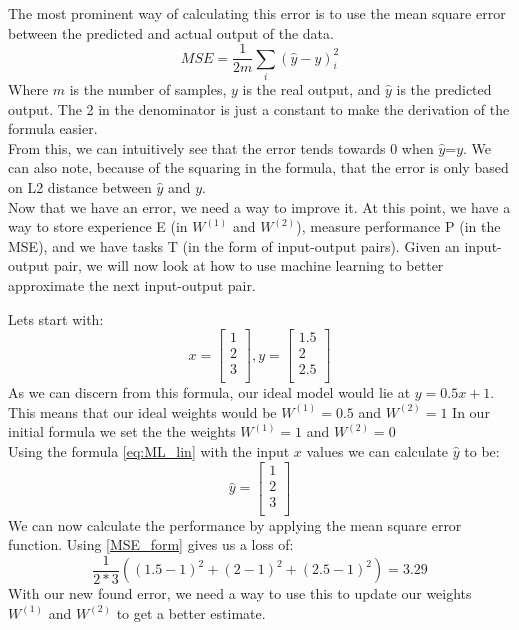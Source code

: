 The most prominent way of calculating this error is to use the mean square error between the predicted and actual output of the data. 
\begin{equation}\label{MSE_form}
     MSE=\frac{1}{2m} \sum_i (\hat{y}-y)_i^2
\end{equation}
Where $m$ is the number of samples, $y$ is the real output, and $\hat{y}$ is the predicted output. The 2 in the denominator is just a constant to make the derivation of the formula easier.\\
From this, we can intuitively see that the error tends towards 0 when $\hat{y}$=$y$. We can also note, because of the squaring in the formula, that the error is only based on L2 distance between $\hat{y}$ and $y$.\\
Now that we have an error, we need a way to improve it.
At this point, we have a way to store experience E (in  $W^{(1)}$ and $W^{(2)}$), measure performance P (in the MSE), and we have tasks T (in the form of input-output pairs).
Given an input-output pair, we will now look at how to use machine learning to better approximate the next input-output pair.

\vspace{5px}
Lets start with: 
\begin{equation}
    x=\left[ \begin{array}{c} 1\\ 2\\ 3\\ \end{array} \right],
    y=\left[\begin{array}{c} 1.5\\2\\ 2.5\\\end{array}\right]
\end{equation}
As we can discern from this formula, our ideal model would lie at $y=0.5x + 1$. This means that our ideal weights would be  $W^{(1)}=0.5$ and $W^{(2)}=1$
In our initial formula we set the the weights $W^{(1)}=1$ and $W^{(2)}=0$\\
Using the formula \ref{eq:ML_lin} with the input $x$ values we can calculate  $\hat{y}$ to be:
\begin{equation}
    \hat{y}=\left[\begin{array}{c} 1\\ 2\\ 3\\ \end{array}\right]
\end{equation}
We can now calculate the performance by applying the mean square error function. Using \ref{MSE_form} gives us a loss of:
\begin{equation}
   \frac{1}{2*3} \left( {(1.5-1)}^2+{(2-1)}^2+{(2.5-1)}^2 \right) = 3.29
\end{equation}
With our new found error, we need a way to use this to update our weights $W^{(1)}$ and $W^{(2)}$ to get a better estimate. 
    


